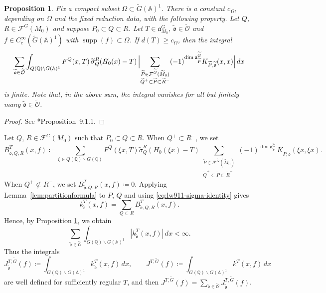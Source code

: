 \documentclass[12pt]{amsart}
\theoremstyle{definition}
\theoremstyle{plain}
\newtheorem{proposition}[definition]{Proposition}
\theoremstyle{remark}
\def\Q{\mathbb{Q}}%
\def\A{\mathbb{A}}%
\DeclareMathOperator{\supp}{supp}%
\newcommand{\fa}{\mathfrak{a}}
\newcommand{\cF}{\mathcal{F}}
\numberwithin{equation}{section}
\newcommand{\tG}{\widetilde{G}}
\newcommand{\tM}{\widetilde{M}}
\newcommand{\tP}{\widetilde{P}}
\newcommand{\tQ}{\widetilde{Q}}
\newcommand{\tR}{\widetilde{R}}
\newcommand{\tsigma}{\widetilde{\sigma}}
\newcommand{\tfo}{\widetilde{\mathfrak{o}}}
\newcommand{\tcO}{\widetilde{\mathcal{O}}}
\begin{document}
\begin{proposition}
\label{prop:lw911}
Fix a compact subset $\Omega\subset\tG(\A)^1$.
There is a constant $c_\Omega$, depending on $\Omega$ and the
fixed reduction data, with the following property.
Let $Q$, $R\in\cF^G(M_0)$ and suppose $P_0\subset Q\subset R$. 
Let $T\in\fa_{M_0}^G$, $\tfo\in\tcO$ and $f\in C_c^\infty(\tG(\A)^1)$ with $\supp(f)\subset\Omega$.
If $d(T)\geq c_\Omega$, then the integral
\[
\sum_{\tfo\in\tcO}\int_{Q(\Q)\backslash G(\A)^1}
       F^Q(x,T)\,
        \widetilde\sigma_Q^R(H_0(x)-T)\, 
       \Bigl|
         \sum_{\substack{\tP\in\cF^{\tG}(\tM_0) \\ \widetilde Q^+\subset\tP
                                 \subset\widetilde R^-}}
           (-1)^{\dim\fa_{\tP}^{\tG}}
           K_{\tP,\tfo}(x,x)
       \Bigr|\,dx
\]
is finite. 
Note that, in the above sum, the integral vanishes for all but finitely many $\tfo\in\tcO$.
\end{proposition}
\begin{proof}
See \cite{LW13}*{Proposition~9.1.1}.
\end{proof}




Let $Q$, $R\in\cF^G(M_0)$ such that $P_0\subset Q\subset R$. 
When $Q^+\subset R^-$, we set
\begin{equation*}
 B_{\tfo,Q,R}^T(x,f)
 \coloneqq \sum_{\xi\in Q(\Q)\backslash G(\Q)}
    F^Q(\xi x,T)\tsigma_Q^R(H_0(\xi x)-T)
    \sum_{\substack{\tP\in\cF^{\tG}(\tM_0) \\ \tQ^+\subset \tP\subset \tR^-}}
       (-1)^{\dim\fa_{\tP}^{\tG}}\, K_{\tP,\tfo}(\xi x,\xi x).
\end{equation*}
When $Q^+\not\subset R^-$, we set $B_{\tfo,Q,R}^T(x,f)\coloneqq 0$. 
Applying Lemma~\ref{lem:partitionformula} to $P$, $Q$ and using \eqref{eq:lw911-sigma-identity} gives
\begin{equation*}
 k_{\tfo}^T(x,f)=\sum_{Q\subset R}B_{\tfo,Q,R}^T(x,f).
\end{equation*}
Hence, by Proposition \ref{prop:lw911}, we obtain
\[
  \sum_{\tfo\in\tcO}\int_{G(\Q)\backslash G(\A)^1}|k_{\tfo}^T(x,f)|\,dx    <\infty.
\]
Thus the integrals
\[
  J_{\tfo}^{T,\tG}(f)
     \coloneqq \int_{G(\Q)\backslash G(\A)^1}
          k_{\tfo}^T(x,f)\,dx, \qquad   J^{T,\tG}(f)
     \coloneqq \int_{G(\Q)\backslash G(\A)^1}
          k^T(x,f)\,dx
\]
are well defined for sufficiently regular $T$, and then $J^{T,\tG}(f)=\sum_{\tfo\in\tcO}J_{\tfo}^{T,\tG}(f)$. 
\end{document}
